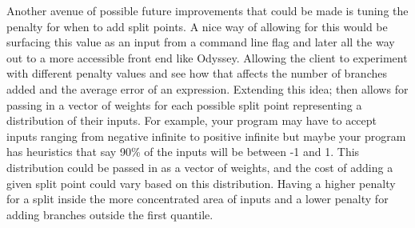 \documentclass{article}
\begin{document}
Another avenue of possible future improvements that could be made is tuning the penalty for when to add split points. A nice way of allowing for this would be surfacing this value as an input from a command line flag and later all the way out to a more accessible front end like Odyssey. Allowing the client to experiment with different penalty values and see how that affects the number of branches added and the average error of an expression. Extending this idea; then allows for passing in a vector of weights for each possible split point representing a distribution of their inputs. For example, your program may have to accept inputs ranging from negative infinite to positive infinite but maybe your program has heuristics that say 90\% of the inputs will be between -1 and 1.  This distribution could be passed in as a vector of weights, and the cost of adding a given split point could vary based on this distribution. Having a higher penalty for a split inside the more concentrated area of inputs and a lower penalty for adding branches outside the first quantile.



\newpage
\appendix
\lstset{style=racket-source-code}
\end{document}
